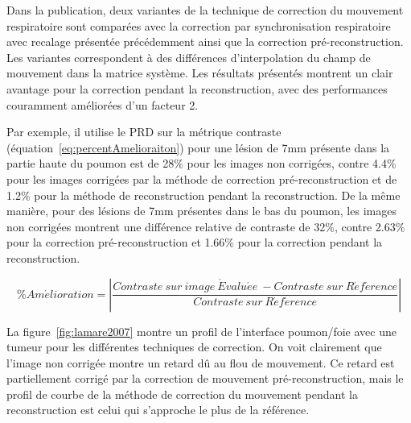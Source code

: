 Dans la publication, deux variantes de la technique de correction du mouvement respiratoire sont comparées avec la correction par synchronisation respiratoire avec recalage présentée précédemment ainsi que la correction pré-reconstruction. Les variantes correspondent à des différences d'interpolation du champ de mouvement dans la matrice système. Les résultats présentés montrent un clair avantage pour la correction pendant la reconstruction, avec des performances couramment améliorées d'un facteur 2. 

Par exemple, il utilise le PRD sur la métrique contraste (équation~\ref{eq:percentAmelioraiton}) pour une lésion de 7mm présente dans la partie haute du poumon est de 28\% pour les images non corrigées, contre 4.4\% pour les images corrigées par la méthode de correction pré-reconstruction et de 1.2\% pour la méthode de reconstruction pendant la reconstruction. De la même manière, pour des lésions de 7mm présentes dans le bas du poumon, les images non corrigées montrent une différence relative de contraste de 32\%, contre 2.63\% pour la correction pré-reconstruction et 1.66\% pour la correction pendant la reconstruction.


\begin{equation}
 \label{eq:percentAmelioraiton}
 \% Am\acute{e}lioration = \left| \frac{Contraste~sur~image~\acute{E}valu\acute{e}e~-Contraste~sur~R\acute{e}f\acute{e}rence}{Contraste~sur~R\acute{e}f\acute{e}rence} \right|
\end{equation}

La figure~\ref{fig:lamare2007} montre un profil de l'interface poumon/foie avec une tumeur pour les différentes techniques de correction. On voit clairement que l'image non corrigée montre un retard dû au flou de mouvement. Ce retard est partiellement corrigé par la correction de mouvement pré-reconstruction, mais le profil de courbe de la méthode de correction du mouvement pendant la reconstruction est celui qui s'approche le plus de la référence.


